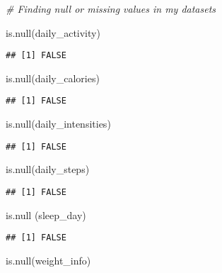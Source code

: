 \documentclass[
]{article}
\newenvironment{Shaded}{\begin{snugshade}}{\end{snugshade}}
\newcommand{\CommentTok}[1]{\textcolor[rgb]{0.56,0.35,0.01}{\textit{#1}}}
\newcommand{\FunctionTok}[1]{\textcolor[rgb]{0.00,0.00,0.00}{#1}}
\newcommand{\NormalTok}[1]{#1}
\begin{document}
\begin{Shaded}
\begin{Highlighting}[]
\CommentTok{\# Finding null or missing values in my datasets}

\FunctionTok{is.null}\NormalTok{(daily\_activity)}
\end{Highlighting}
\end{Shaded}

\begin{verbatim}
## [1] FALSE
\end{verbatim}

\begin{Shaded}
\begin{Highlighting}[]
\FunctionTok{is.null}\NormalTok{(daily\_calories)}
\end{Highlighting}
\end{Shaded}

\begin{verbatim}
## [1] FALSE
\end{verbatim}

\begin{Shaded}
\begin{Highlighting}[]
\FunctionTok{is.null}\NormalTok{(daily\_intensities)}
\end{Highlighting}
\end{Shaded}

\begin{verbatim}
## [1] FALSE
\end{verbatim}

\begin{Shaded}
\begin{Highlighting}[]
\FunctionTok{is.null}\NormalTok{(daily\_steps)}
\end{Highlighting}
\end{Shaded}

\begin{verbatim}
## [1] FALSE
\end{verbatim}

\begin{Shaded}
\begin{Highlighting}[]
\FunctionTok{is.null}\NormalTok{ (sleep\_day)}
\end{Highlighting}
\end{Shaded}

\begin{verbatim}
## [1] FALSE
\end{verbatim}

\begin{Shaded}
\begin{Highlighting}[]
\FunctionTok{is.null}\NormalTok{(weight\_info)}
\end{Highlighting}
\end{Shaded}
\end{document}
